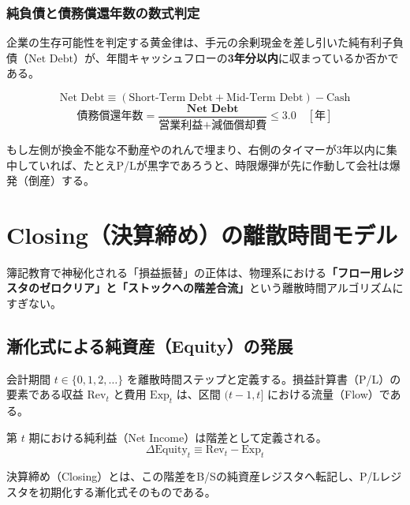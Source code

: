 \documentclass[11pt, a4paper]{report}
\begin{document}
\subsection{純負債と債務償還年数の数式判定}

企業の生存可能性を判定する黄金律は、手元の余剰現金を差し引いた純有利子負債（$\text{Net Debt}$）が、年間キャッシュフローの\textbf{3年分以内}に収まっているか否かである。

\begin{equation}
    \text{Net Debt} \equiv (\text{Short-Term Debt} + \text{Mid-Term Debt}) - \text{Cash}
\end{equation}
\begin{equation}
    \mathbf{\text{債務償還年数} = \frac{\text{Net Debt}}{\text{営業利益} + \text{減価償却費}} \le 3.0 \quad [\text{年}]}
\end{equation}

もし左側が換金不能な不動産やのれんで埋まり、右側のタイマーが3年以内に集中していれば、たとえP/Lが黒字であろうと、時限爆弾が先に作動して会社は爆発（倒産）する。

\chapter{Closing（決算締め）の離散時間モデル}
\label{chap:closing_model}

簿記教育で神秘化される「損益振替」の正体は、物理系における\textbf{「フロー用レジスタのゼロクリア」と「ストックへの階差合流」}という離散時間アルゴリズムにすぎない。

\section{漸化式による純資産（Equity）の発展}

会計期間 $t \in \{0, 1, 2, \dots\}$ を離散時間ステップと定義する。損益計算書（P/L）の要素である収益 $\text{Rev}_t$ と費用 $\text{Exp}_t$ は、区間 $(t-1, t]$ における流量（Flow）である。

第 $t$ 期における純利益（Net Income）は階差として定義される。
\begin{equation}
    \Delta \text{Equity}_t \equiv \text{Rev}_t - \text{Exp}_t
\end{equation}

決算締め（Closing）とは、この階差をB/Sの純資産レジスタへ転記し、P/Lレジスタを初期化する漸化式そのものである。
\end{document}
